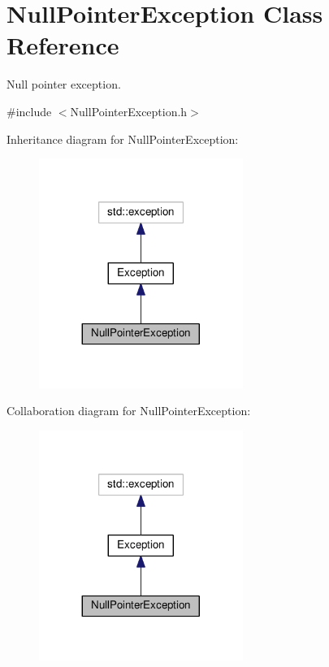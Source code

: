 \hypertarget{classNullPointerException}{}\section{Null\+Pointer\+Exception Class Reference}
\label{classNullPointerException}


Null pointer exception.  




{\ttfamily \#include $<$Null\+Pointer\+Exception.\+h$>$}



Inheritance diagram for Null\+Pointer\+Exception\+:
\nopagebreak
\begin{figure}[H]
\begin{center}
\leavevmode
\includegraphics[width=188pt]{classNullPointerException__inherit__graph}
\end{center}
\end{figure}


Collaboration diagram for Null\+Pointer\+Exception\+:
\nopagebreak
\begin{figure}[H]
\begin{center}
\leavevmode
\includegraphics[width=188pt]{classNullPointerException__coll__graph}
\end{center}
\end{figure}
